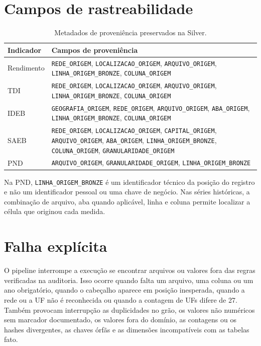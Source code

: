 \section{Campos de rastreabilidade}

\begin{table}[H]
\centering
\scriptsize
\caption{Metadados de proveniência preservados na Silver.}
\label{tab:ap-proveniencia}
\renewcommand{\arraystretch}{1.15}
\begin{tabular}{|p{3.1cm}|p{11.8cm}|}
\hline
\textbf{Indicador} & \textbf{Campos de proveniência} \\ \hline
Rendimento & \texttt{REDE\_ORIGEM}, \texttt{LOCALIZACAO\_ORIGEM}, \texttt{ARQUIVO\_ORIGEM}, \texttt{LINHA\_ORIGEM\_BRONZE}, \texttt{COLUNA\_ORIGEM} \\ \hline
TDI & \texttt{REDE\_ORIGEM}, \texttt{LOCALIZACAO\_ORIGEM}, \texttt{ARQUIVO\_ORIGEM}, \texttt{LINHA\_ORIGEM\_BRONZE}, \texttt{COLUNA\_ORIGEM} \\ \hline
IDEB & \texttt{GEOGRAFIA\_ORIGEM}, \texttt{REDE\_ORIGEM}, \texttt{ARQUIVO\_ORIGEM}, \texttt{ABA\_ORIGEM}, \texttt{LINHA\_ORIGEM\_BRONZE}, \texttt{COLUNA\_ORIGEM} \\ \hline
SAEB & \texttt{REDE\_ORIGEM}, \texttt{LOCALIZACAO\_ORIGEM}, \texttt{CAPITAL\_ORIGEM}, \texttt{ARQUIVO\_ORIGEM}, \texttt{ABA\_ORIGEM}, \texttt{LINHA\_ORIGEM\_BRONZE}, \texttt{COLUNA\_ORIGEM}, \texttt{GRANULARIDADE\_ORIGEM} \\ \hline
PND & \texttt{ARQUIVO\_ORIGEM}, \texttt{GRANULARIDADE\_ORIGEM}, \texttt{LINHA\_ORIGEM\_BRONZE} \\ \hline
\end{tabular}
\end{table}

Na PND, \texttt{LINHA\_ORIGEM\_BRONZE} é um identificador técnico da posição do registro e não um identificador pessoal ou uma chave de negócio. Nas séries históricas, a combinação de arquivo, aba quando aplicável, linha e coluna permite localizar a célula que originou cada medida.

\section{Falha explícita}

O pipeline interrompe a execução se encontrar arquivos ou valores fora das regras verificadas na auditoria. Isso ocorre quando falta um arquivo, uma coluna ou um ano obrigatório, quando o cabeçalho aparece em posição inesperada, quando a rede ou a UF não é reconhecida ou quando a contagem de UFs difere de 27. Também provocam interrupção as duplicidades no grão, os valores não numéricos sem marcador documentado, os valores fora do domínio, as contagens ou os hashes divergentes, as chaves órfãs e as dimensões incompatíveis com as tabelas fato.


